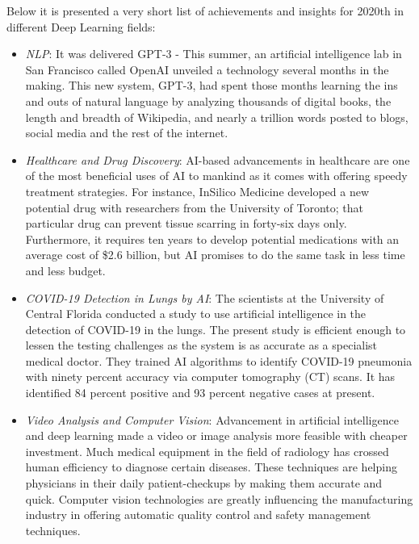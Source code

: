 Below it is presented a very short list of achievements and insights for 2020th in different Deep Learning fields:
\begin{itemize}
  \item \emph{NLP}: It was delivered GPT-3 - This summer, an artificial intelligence lab in San Francisco called OpenAI unveiled a technology several months in the making. This new system, GPT-3, had spent those months learning the ins and outs of natural language by analyzing thousands of digital books, the length and breadth of Wikipedia, and nearly a trillion words posted to blogs, social media and the rest of the internet.
  \item \emph{Healthcare and Drug Discovery}: AI-based advancements in healthcare are one of the most beneficial uses of AI to mankind as it comes with offering speedy treatment strategies. For instance, InSilico Medicine developed a new potential drug with researchers from the University of Toronto; that particular drug can prevent tissue scarring in forty-six days only. Furthermore, it requires ten years to develop potential medications with an average cost of \$2.6 billion, but AI promises to do the same task in less time and less budget.
 \item \emph{COVID-19 Detection in Lungs by AI}: The scientists at the University of Central Florida conducted a study to use artificial intelligence in the detection of COVID-19 in the lungs. The present study is efficient enough to lessen the testing challenges as the system is as accurate as a specialist medical doctor. They trained AI algorithms to identify COVID-19 pneumonia with ninety percent accuracy via computer tomography (CT) scans. It has identified 84 percent positive and 93 percent negative cases at present.
 \item \emph{Video Analysis and Computer Vision}: Advancement in artificial intelligence and deep learning made a video or image analysis more feasible with cheaper investment. Much medical equipment in the field of radiology has crossed human efficiency to diagnose certain diseases. These techniques are helping physicians in their daily patient-checkups by making them accurate and quick. Computer vision technologies are greatly influencing the manufacturing industry in offering automatic quality control and safety management techniques.
\end{itemize}


